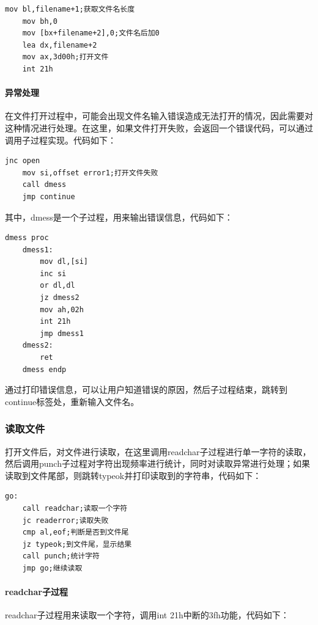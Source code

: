 \documentclass[UTF8,12pt]{article}
\begin{document}
\begin{lstlisting}[title=对文件名进行操作并打开文件,frame=shadowbox]
    mov bl,filename+1;获取文件名长度
    mov bh,0
    mov [bx+filename+2],0;文件名后加0
    lea dx,filename+2
    mov ax,3d00h;打开文件
    int 21h
\end{lstlisting}

\paragraph{异常处理}
在文件打开过程中，可能会出现文件名输入错误造成无法打开的情况，因此需要对这种情况进行处理。在这里，如果文件打开失败，会返回一个错误代码，可以通过调用子过程实现。代码如下：

\begin{lstlisting}[title=异常处理,frame=shadowbox]
    jnc open
    mov si,offset error1;打开文件失败
    call dmess
    jmp continue
\end{lstlisting}

其中，dmess是一个子过程，用来输出错误信息，代码如下：

\begin{lstlisting}[title=dmess,frame=shadowbox]
    dmess proc
    dmess1:
        mov dl,[si]
        inc si
        or dl,dl
        jz dmess2
        mov ah,02h
        int 21h
        jmp dmess1
    dmess2:
        ret
    dmess endp
\end{lstlisting}

通过打印错误信息，可以让用户知道错误的原因，然后子过程结束，跳转到continue标签处，重新输入文件名。

\subsubsection{读取文件}
打开文件后，对文件进行读取，在这里调用readchar子过程进行单一字符的读取，然后调用punch子过程对字符出现频率进行统计，同时对读取异常进行处理；如果读取到文件尾部，则跳转typeok并打印读取到的字符串，代码如下：

\begin{lstlisting}[title=读取文件,frame=shadowbox]
    go:
    call readchar;读取一个字符
    jc readerror;读取失败
    cmp al,eof;判断是否到文件尾
    jz typeok;到文件尾，显示结果
    call punch;统计字符
    jmp go;继续读取
\end{lstlisting}

\paragraph{readchar子过程}
readchar子过程用来读取一个字符，调用int 21h中断的3fh功能，代码如下：
\end{document}

